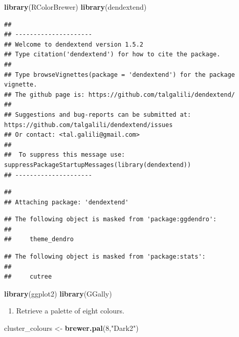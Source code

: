 \documentclass[]{book}
\newenvironment{Shaded}{\begin{snugshade}}{\end{snugshade}}
\newcommand{\KeywordTok}[1]{\textcolor[rgb]{0.13,0.29,0.53}{\textbf{{#1}}}}
\newcommand{\DecValTok}[1]{\textcolor[rgb]{0.00,0.00,0.81}{{#1}}}
\newcommand{\StringTok}[1]{\textcolor[rgb]{0.31,0.60,0.02}{{#1}}}
\newcommand{\NormalTok}[1]{{#1}}
\providecommand{\tightlist}{%
  \setlength{\itemsep}{0pt}\setlength{\parskip}{0pt}}
\theoremstyle{definition}
\theoremstyle{definition}
\theoremstyle{definition}
\theoremstyle{remark}
\begin{document}
\begin{Shaded}
\begin{Highlighting}[]
\KeywordTok{library}\NormalTok{(RColorBrewer)}
\KeywordTok{library}\NormalTok{(dendextend)}
\end{Highlighting}
\end{Shaded}

\begin{verbatim}
## 
## ---------------------
## Welcome to dendextend version 1.5.2
## Type citation('dendextend') for how to cite the package.
## 
## Type browseVignettes(package = 'dendextend') for the package vignette.
## The github page is: https://github.com/talgalili/dendextend/
## 
## Suggestions and bug-reports can be submitted at: https://github.com/talgalili/dendextend/issues
## Or contact: <tal.galili@gmail.com>
## 
##  To suppress this message use:  suppressPackageStartupMessages(library(dendextend))
## ---------------------
\end{verbatim}

\begin{verbatim}
## 
## Attaching package: 'dendextend'
\end{verbatim}

\begin{verbatim}
## The following object is masked from 'package:ggdendro':
## 
##     theme_dendro
\end{verbatim}

\begin{verbatim}
## The following object is masked from 'package:stats':
## 
##     cutree
\end{verbatim}

\begin{Shaded}
\begin{Highlighting}[]
\KeywordTok{library}\NormalTok{(ggplot2)}
\KeywordTok{library}\NormalTok{(GGally)}
\end{Highlighting}
\end{Shaded}

\begin{enumerate}
\def\labelenumi{\arabic{enumi}.}
\setcounter{enumi}{1}
\tightlist
\item
  Retrieve a palette of eight colours.
\end{enumerate}

\begin{Shaded}
\begin{Highlighting}[]
\NormalTok{cluster_colours <-}\StringTok{ }\KeywordTok{brewer.pal}\NormalTok{(}\DecValTok{8}\NormalTok{,}\StringTok{"Dark2"}\NormalTok{)}
\end{Highlighting}
\end{Shaded}
\end{document}
